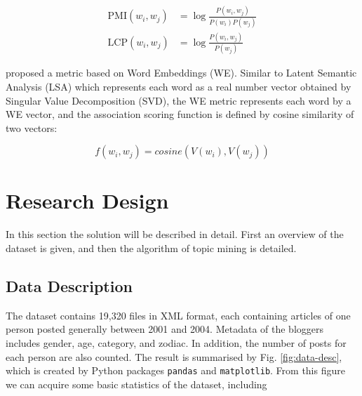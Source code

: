 \documentclass[conference]{IEEEtran}
\begin{document}
\begin{align*}
\mathrm{PMI}(w_i, w_j) &= \log \frac{P(w_i, w_j)}{P(w_i) P(w_j)} \\
\mathrm{LCP}(w_i, w_j) &= \log \frac{P(w_i, w_j)}{P(w_j)}
\end{align*}

\textcite{fang_using_2016} proposed a metric based on Word Embeddings
(WE). Similar to Latent Semantic Analysis (LSA) which represents each
word as a real number vector obtained by Singular Value Decomposition
(SVD), the WE metric represents each word by a WE vector, and the
association scoring function is defined by cosine similarity of two
vectors:

\[f(w_i, w_j) = \mathit{cosine}(V(w_i), V(w_j))\]

\hypertarget{research-design}{%
\section{Research Design}\label{research-design}}

In this section the solution will be described in detail. First an
overview of the dataset is given, and then the algorithm of topic mining
is detailed.

\hypertarget{data-description}{%
\subsection{Data Description}\label{data-description}}

The dataset contains 19,320 files in XML format, each containing
articles of one person posted generally between 2001 and 2004. Metadata
of the bloggers includes gender, age, category, and zodiac. In addition,
the number of posts for each person are also counted. The result is
summarised by Fig. \ref{fig:data-desc}, which is created by Python
packages \texttt{pandas} and \texttt{matplotlib}. From this figure we
can acquire some basic statistics of the dataset, including
\end{document}
